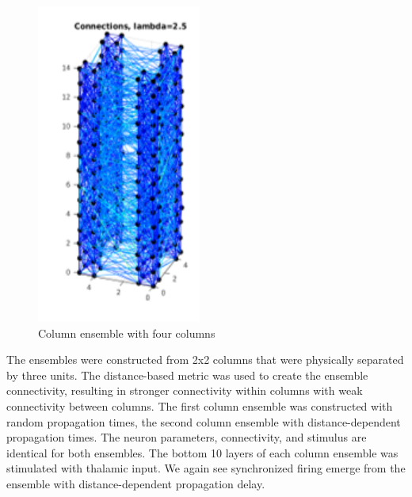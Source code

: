\documentclass[a4paper,11pt]{article}
\begin{document}
\begin{figure}[ht]
 \caption{Column ensemble with four columns}
 \label{fig:column_ensemble}
 \centering
   \includegraphics[width=0.48\textwidth]{fig/multicolumn}
\end{figure}
The ensembles were constructed from 2x2 columns that were physically separated by three units. 
The distance-based metric was used to create the ensemble connectivity, resulting in stronger connectivity within columns with weak connectivity between columns.
The first column ensemble was constructed with random propagation times, the second column ensemble with distance-dependent propagation times.
The neuron parameters, connectivity, and stimulus are identical for both ensembles.
The bottom 10 layers of each column ensemble was stimulated with thalamic input.
We again see synchronized firing emerge from the ensemble with distance-dependent propagation delay.
\end{document}
